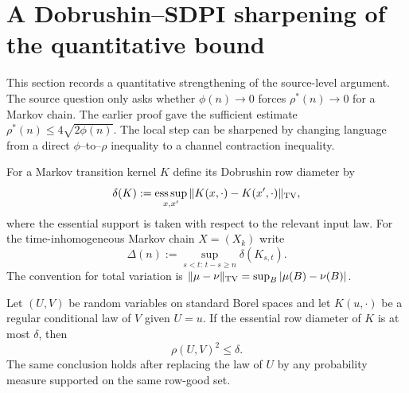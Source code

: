
\section{A Dobrushin--SDPI sharpening of the quantitative bound}
\label{sec:sdpi-sharpening}

This section records a quantitative strengthening of the source-level argument.
The source question only asks whether $\phi(n)\to0$ forces $\rho^*(n)\to0$ for a
Markov chain.  The earlier proof gave the sufficient estimate
$\rho^*(n)\le 4\sqrt{2\phi(n)}$.  The local step can be sharpened by changing
language from a direct $\phi$--to--$\rho$ inequality to a channel contraction
inequality.

For a Markov transition kernel $K$ define its Dobrushin row diameter by
\[
  \delta(K):=\operatorname*{ess\,sup}_{x,x'}
  \|K(x,\cdot)-K(x',\cdot)\|_{\rm TV},
\]
where the essential support is taken with respect to the relevant input law.
For the time-inhomogeneous Markov chain $X=(X_k)$ write
\[
  \Delta(n):=\sup_{s<t:\,t-s\ge n}\delta(K_{s,t}).
\]
The convention for total variation is
$\|\mu-\nu\|_{\rm TV}=\sup_B|\mu(B)-\nu(B)|$.

\begin{lemma}
\label{lem:dobrushin-rho}
Let $(U,V)$ be random variables on standard Borel spaces and let $K(u,\cdot)$
be a regular conditional law of $V$ given $U=u$.  If the essential row
diameter of $K$ is at most $\delta$, then
\[
  \rho(U,V)^2\le \delta.
\]
The same conclusion holds after replacing the law of $U$ by any probability
measure supported on the same row-good set.
\end{lemma}


